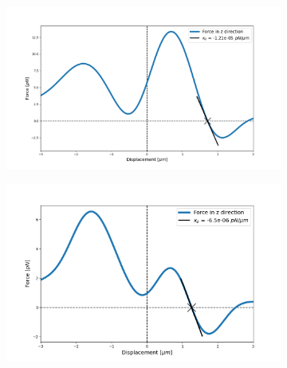 \documentclass[preprint,  3p]{elsarticle}
\begin{document}
\begin{figure}
\begin{subfigure}{.475\linewidth}
	\includegraphics[width=\linewidth]{Images/lam=2_theta=0.png}
	\caption{}
	\label{lam=2}
\end{subfigure}\hfill %
\begin{subfigure}{.475\linewidth}
	\includegraphics[width=\linewidth]{Images/lam=4_theta=0.png}
	\caption{}
	\label{lam=4}
\end{subfigure}


\end{figure}
\end{document}
